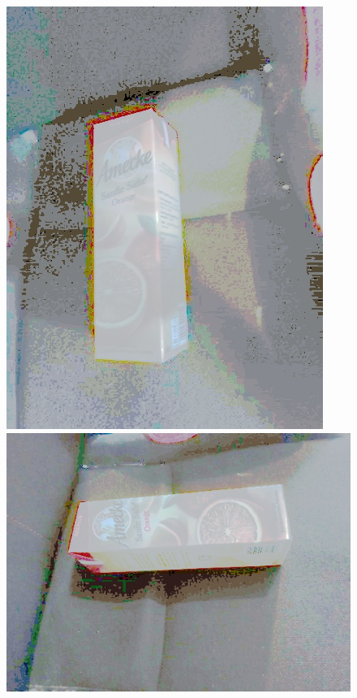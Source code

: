 \begin{appendices}
\begin{figure}[htb]
\begin{minipage}{0.19\textwidth}
\includegraphics[width=\textwidth]{images/anomalien/HS/image159.jpg}
\end{minipage}
\begin{minipage}{0.19\textwidth}
\includegraphics[width=\textwidth]{images/anomalien/HS/image160.jpg}

\end{minipage}
\end{figure}
\end{appendices}
